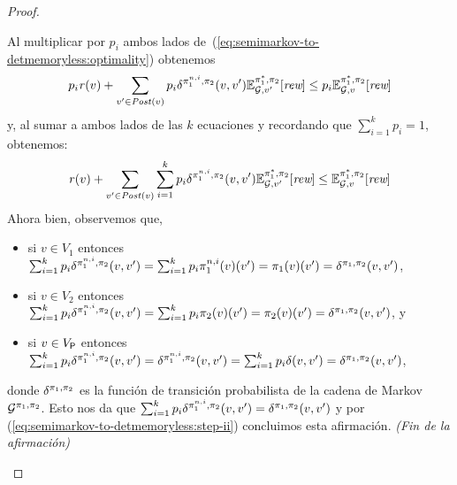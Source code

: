 \begin{proof}
\begin{proofofclaim}
    Al multiplicar por $p_i$ ambos lados de~(\ref{eq:semimarkov-to-detmemoryless:optimality}) obtenemos
    \begin{equation*}\label{eq:semimarkov-to-detmemoryless:step-i}
      p_i \mathit{r}(v) + \sum_{v' \in \mathit{Post}(v)} p_i \delta^{\pi_{1}^{n,i},\pi_{2}}(v, v') \mathbb{E}^{\pi^*_{1}, \pi_{2}}_{\mathcal{G},v'}[\textit{rew}] \leq p_i \mathbb{E}^{\pi^*_{1}, \pi_{2}}_{\mathcal{G},v}[\textit{rew}]
    \end{equation*}
    y, al sumar a ambos lados de las $k$ ecuaciones y recordando que 
    $\sum_{i=1}^kp_i =1$, obtenemos:
    \begin{equation}\label{eq:semimarkov-to-detmemoryless:step-ii}
      \mathit{r}(v) + \sum_{v' \in \mathit{Post}(v)}\sum_{i=1}^k p_i \delta^{\pi_{1}^{n,i},\pi_{2}}(v, v') \mathbb{E}^{\pi^*_{1}, \pi_{2}}_{\mathcal{G},v'}[\textit{rew}] \leq \mathbb{E}^{\pi^*_{1}, \pi_{2}}_{\mathcal{G},v}[\textit{rew}]
    \end{equation}
    Ahora bien, observemos que,
    \begin{itemize}
    \item%
    si $v\in V_1$ entonces
    $\sum_{i=1}^k p_i \delta^{\pi_{1}^{n,i},\pi_{2}}(v, v') = \sum_{i=1}^k p_i \pi_{1}^{n,i}(v)(v') = \pi_{1}(v)(v') = \delta^{\pi_{1},\pi_{2}}(v, v')$,
    \item%
    si $v\in V_2$ entonces
    $\sum_{i=1}^k p_i \delta^{\pi_{1}^{n,i},\pi_{2}}(v, v') = \sum_{i=1}^k p_i \pi_{2}(v)(v') = \pi_{2}(v)(v') = \delta^{\pi_{1},\pi_{2}}(v, v')$, y 
    \item%
    si $v\in V_{\mathsf{P}}$ entonces
    $\sum_{i=1}^k p_i \delta^{\pi_{1}^{n,i},\pi_{2}}(v, v') = \delta^{\pi_{1}^{n,i},\pi_{2}}(v, v') = \sum_{i=1}^k p_i \delta(v,v') = \delta^{\pi_{1},\pi_{2}}(v, v')$,
    \end{itemize}
    donde $\delta^{\pi_{1},\pi_{2}}$ es la función de transición probabilista de la cadena de Markov $\mathcal{G}^{\pi_{1},\pi_{2}}$.
    Esto nos da que
    $\sum_{i=1}^k p_i \delta^{\pi_{1}^{n,i},\pi_{2}}(v, v') = \delta^{\pi_{1},\pi_{2}}(v, v')$
    y por (\ref{eq:semimarkov-to-detmemoryless:step-ii}) concluimos esta afirmación.
    \hfill\emph{(Fin de la afirmación)}\qedhere
  \end{proofofclaim}


\end{proof}
